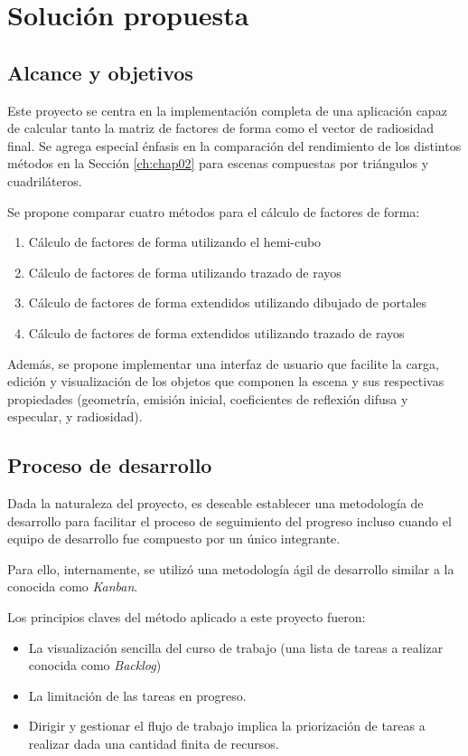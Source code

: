 \chapter{Solución propuesta}
\label{ch:chap03}

\section{Alcance y objetivos}
\label{sec:alcance}

Este proyecto se centra en la implementación completa de una aplicación capaz de calcular tanto la matriz de factores de forma como el vector de radiosidad final. Se agrega especial énfasis en la comparación del rendimiento de los distintos métodos en la Sección \ref{ch:chap02} para escenas compuestas por triángulos y cuadriláteros.

Se propone comparar cuatro métodos para el cálculo de factores de forma:

\begin{enumerate}
 	\item Cálculo de factores de forma utilizando el hemi-cubo
 	\item  Cálculo de factores de forma utilizando trazado de rayos
 	\item Cálculo de factores de forma extendidos utilizando dibujado de portales
 	\item Cálculo de factores  de forma extendidos utilizando trazado de rayos
\end{enumerate}

Además, se propone implementar una interfaz de usuario que facilite la carga, edición y visualización de los objetos que componen la escena y sus respectivas propiedades (geometría, emisión inicial, coeficientes de reflexión difusa y especular, y radiosidad).

\section{Proceso de desarrollo}
\label{sec:procdes}

Dada la naturaleza del proyecto, es deseable establecer una metodología de desarrollo para facilitar el proceso de seguimiento del progreso incluso cuando el equipo de desarrollo fue compuesto por un único integrante.

Para ello, internamente, se utilizó una metodología ágil de desarrollo similar a la conocida como \textit{Kanban}.

Los principios claves del método aplicado a este proyecto fueron:
\begin{itemize}
	\item La visualización sencilla del curso de trabajo (una lista de tareas a realizar conocida como \textit{Backlog})
	\item La limitación de las tareas en progreso.
	\item Dirigir y gestionar el flujo de trabajo implica la priorización de tareas a realizar dada una cantidad finita de recursos.
\end{itemize}

